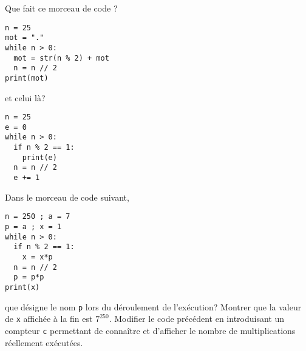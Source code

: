 Que fait ce morceau de code ?
\begin{verbatim}
n = 25
mot = "."
while n > 0:
  mot = str(n % 2) + mot
  n = n // 2
print(mot) 
\end{verbatim}
et celui là?
\begin{verbatim}
n = 25
e = 0
while n > 0:
  if n % 2 == 1:
    print(e)
  n = n // 2
  e += 1
\end{verbatim}
Dans le morceau de code suivant,
\begin{verbatim}
n = 250 ; a = 7
p = a ; x = 1
while n > 0:
  if n % 2 == 1:
    x = x*p
  n = n // 2
  p = p*p
print(x) 
\end{verbatim}
que désigne le nom \verb|p| lors du déroulement de l'exécution? Montrer que la valeur de \verb|x| affichée à la fin est $7^{250}$.\newline
Modifier le code précédent en introduisant un compteur \verb|c| permettant de connaître et d'afficher le nombre de multiplications réellement exécutées.

